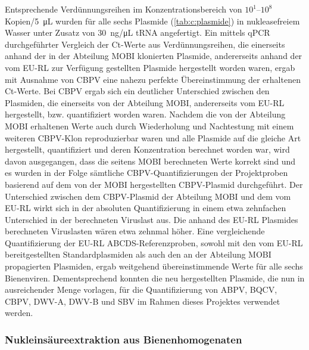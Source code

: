 Entsprechende Verdünnungsreihen im Konzentrationsbereich von $10^1$–$10^8$ Kopien/\SI{5}{\micro\liter} wurden für alle sechs Plasmide (\cref{tab:c:plasmide}) in nukleasefreiem Wasser unter Zusatz von \SI{30}{\nano\gram}/\si{\micro\liter} tRNA angefertigt. Ein mittels qPCR durchgeführter Vergleich der Ct-Werte aus Verdünnungsreihen, die einerseits anhand der in der Abteilung MOBI klonierten Plasmide, andererseits anhand der vom EU-RL zur Verfügung gestellten Plasmide hergestellt worden waren, ergab mit Ausnahme von CBPV eine nahezu perfekte Übereinstimmung der erhaltenen Ct-Werte. Bei CBPV ergab sich ein deutlicher Unterschied zwischen den Plasmiden, die einerseits von der Abteilung MOBI, andererseits vom EU-RL hergestellt, bzw. quantifiziert worden waren. Nachdem die von der Abteilung MOBI erhaltenen Werte auch durch Wiederholung und Nachtestung mit einem weiteren CBPV-Klon reproduzierbar waren und alle Plasmide auf die gleiche Art hergestellt, quantifiziert und deren Konzentration berechnet worden war, wird davon ausgegangen, dass die seitens MOBI berechneten Werte korrekt sind und es wurden in der Folge sämtliche CBPV-Quantifizierungen der Projektproben basierend auf dem von der MOBI hergestellten CBPV-Plasmid durchgeführt. Der Unterschied zwischen dem CBPV-Plasmid der Abteilung MOBI und dem vom EU-RL wirkt sich in der absoluten Quantifizierung in einem etwa zehnfachen Unterschied in der berechneten Viruslast aus. Die anhand des EU-RL Plasmides berechneten Viruslasten wären etwa zehnmal höher. Eine vergleichende Quantifizierung der EU-RL ABCDS-Referenzproben, sowohl mit den vom EU-RL bereitgestellten Standardplasmiden als auch den an der Abteilung MOBI propagierten Plasmiden, ergab weitgehend übereinstimmende Werte für alle sechs Bienenviren. Dementsprechend konnten die neu hergestellten Plasmide, die nun in ausreichender Menge vorlagen, für die Quantifizierung von ABPV, BQCV, CBPV, DWV-A, DWV-B und SBV im Rahmen dieses Projektes verwendet werden.

\subsubsection{Nukleinsäureextraktion aus Bienenhomogenaten} 
\label{chap:extraktion}

